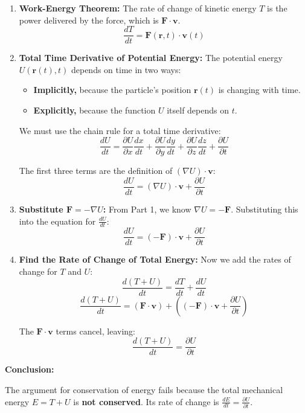 \documentclass[11pt, a4paper]{article} %
\begin{document}
\begin{enumerate}
    \item \textbf{Work-Energy Theorem:}
    The rate of change of kinetic energy $T$ is the power delivered by the force, which is $\mathbf{F} \cdot \mathbf{v}$.
    $$\frac{dT}{dt} = \mathbf{F}(\mathbf{r}, t) \cdot \mathbf{v}(t)$$

    \item \textbf{Total Time Derivative of Potential Energy:}
    The potential energy $U(\mathbf{r}(t), t)$ depends on time in two ways:
    \begin{itemize}
        \item \textbf{Implicitly,} because the particle's position $\mathbf{r}(t)$ is changing with time.
        \item \textbf{Explicitly,} because the function $U$ itself depends on $t$.
    \end{itemize}
    
    We must use the chain rule for a total time derivative:
    $$\frac{dU}{dt} = \frac{\partial U}{\partial x}\frac{dx}{dt} + \frac{\partial U}{\partial y}\frac{dy}{dt} + \frac{\partial U}{\partial z}\frac{dz}{dt} + \frac{\partial U}{\partial t}$$
    
    The first three terms are the definition of $(\nabla U) \cdot \mathbf{v}$:
    $$\frac{dU}{dt} = (\nabla U) \cdot \mathbf{v} + \frac{\partial U}{\partial t}$$

    \item \textbf{Substitute $\mathbf{F} = -\nabla U$:}
    From Part 1, we know $\nabla U = -\mathbf{F}$. Substituting this into the equation for $\frac{dU}{dt}$:
    $$\frac{dU}{dt} = (-\mathbf{F}) \cdot \mathbf{v} + \frac{\partial U}{\partial t}$$

    \item \textbf{Find the Rate of Change of Total Energy:}
    Now we add the rates of change for $T$ and $U$:
    $$\frac{d(T+U)}{dt} = \frac{dT}{dt} + \frac{dU}{dt}$$
    $$\frac{d(T+U)}{dt} = (\mathbf{F} \cdot \mathbf{v}) + \left( (-\mathbf{F}) \cdot \mathbf{v} + \frac{\partial U}{\partial t} \right)$$
    
    The $\mathbf{F} \cdot \mathbf{v}$ terms cancel, leaving:
    $$\frac{d(T+U)}{dt} = \frac{\partial U}{\partial t}$$
\end{enumerate}

\textbf{Conclusion:}

The argument for conservation of energy fails because the total mechanical energy $E = T+U$ is \textbf{not conserved}. Its rate of change is $\frac{dE}{dt} = \frac{\partial U}{\partial t}$.
\end{document}
